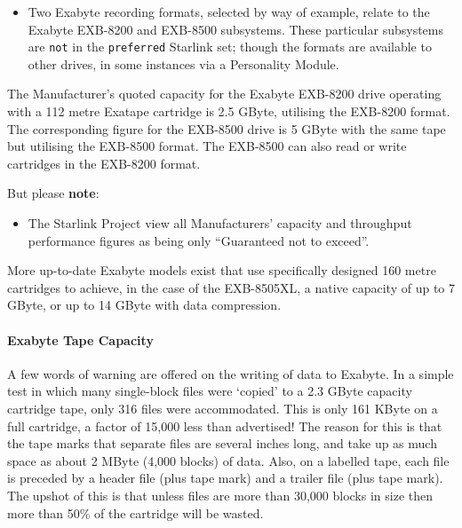 \begin {itemize}

\item[{\huge\bf -}] Two Exabyte recording formats, selected by way of example,
relate to the Exabyte EXB-8200 and EXB-8500 subsystems. These particular
subsystems are {\tt not} in the {\tt preferred} Starlink set; though the
formats are available to other drives, in some instances via a Personality
Module.

\end {itemize}

The Manufacturer's quoted capacity for the Exabyte EXB-8200 drive operating
with a 112 metre Exatape cartridge is 2.5 GByte, utilising the EXB-8200
format. The corresponding figure  for the EXB-8500 drive is 5 GByte with the
same tape but utilising the EXB-8500 format. The EXB-8500 can also read or
write cartridges in the EXB-8200 format.

But please {\bf note}:
\begin {itemize}

\item[{\LARGE\bf $\star$}] The Starlink Project view all Manufacturers' capacity
and throughput performance figures as being only ``Guaranteed not to exceed''.

\end {itemize}
More up-to-date Exabyte models exist that use specifically designed 160 metre
cartridges to achieve, in the case of the EXB-8505XL, a native capacity of
up to 7 GByte, or up to 14 GByte with data compression.

\paragraph {Exabyte Tape Capacity}

A few words of warning are offered on the writing of data to Exabyte. In a
simple test in which many single-block files were `copied' to a 2.3 GByte
capacity cartridge tape, only 316 files were accommodated. This is only 161
KByte on a full cartridge, a factor of 15,000 less than advertised! The
reason for this is that the tape marks that separate files are several
inches long, and take up as much space as about 2 MByte (4,000 blocks) of
data. Also, on a labelled tape, each file is preceded by a header file (plus
tape mark) and a trailer file (plus tape mark). The upshot of this is that
unless files are more than 30,000 blocks in size then more than 50\% of the
cartridge will be wasted.

